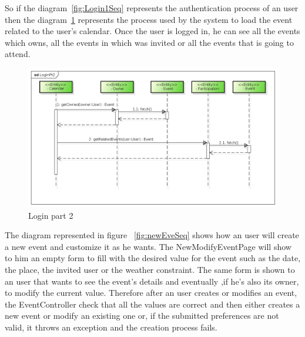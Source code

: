      \begin{center}
So if the diagram~\ref{fig:Login1Seq} represents the authentication process of an user then the diagram~\ref{fig:Login2Seq} represents the process used by the system to load the event related to the user's calendar. Once the user is logged in, he can see all the events which owns, all the events in which was invited or all the events that is going to attend. 
 \begin{figure}[H]
    \includegraphics[width=1\textwidth]{../BCEDiagram/BCE/EntityOverview/LogInPt2.png}
    \caption{Login part 2}
     \label{fig:Login2Seq}
     \end{figure}
   \end{center} 
 The diagram represented in figure ~\ref{fig:newEveSeq} shows how an user will create a new event and customize it as he wants. The NewModifyEventPage will show to him an empty form to fill with the desired value for the event such as the date, the place, the invited user or the weather constraint. The same form is shown to an user that wants to see the event's details and eventually ,if he's also its owner, to modify the current value.
Therefore after an user creates or modifies an event, the EventController check that all the values are correct and then either creates a new event or modify an existing one or, if the submitted preferences are not valid, it throws an exception and the creation process fails.  
